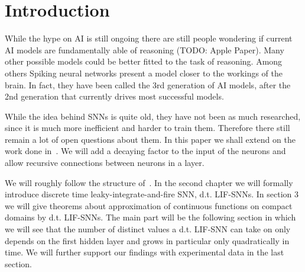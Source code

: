 \section{Introduction}
\label{ch:intro}

While the hype on AI is still ongoing there are still people wondering if current AI models are fundamentally able of reasoning (TODO: Apple Paper). Many other possible models could be better fitted to the task of reasoning. Among others Spiking neural networks present a model closer to the workings of the brain. In fact, they have been called the 3rd generation of AI models, after the 2nd generation that currently drives most successful models.

While the idea behind SNNs is quite old, they have not been as much researched, since it is much more inefficient and harder to train them. Therefore there still remain a lot of open questions about them.
In this paper we shall extend on the work done in~\cite{nguyen2025timespikeunderstandingrepresentational}. We will add a decaying factor to the input of the neurons and allow recursive connections between neurons in a layer.

We will roughly follow the structure of~\cite{nguyen2025timespikeunderstandingrepresentational}. In the second chapter we will formally introduce discrete time leaky-integrate-and-fire SNN, d.t. LIF-SNNs. In section 3 we will give theorems about approximation of continuous functions on compact domains by d.t. LIF-SNNs.
The main part will be the following section in which we will see that the number of distinct values a d.t. LIF-SNN can take on only depends on the first hidden layer and grows in particular only quadratically in time. We will further support our findings with experimental data in the last section.

\cleardoublepage
